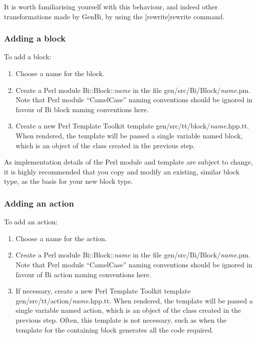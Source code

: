 It is worth familiarising yourself with this behaviour, and indeed other
transformations made by GenBi, by using the
\hyperref[hyper][rewrite]{\sf rewrite} command.

\subsubsection{Adding a block}

To add a block:
\begin{enumerate}
\item Choose a name for the block.
\item Create a Perl module \textsf{Bi::Block::\textit{name}} in the
  file \textsf{gen/src/Bi/Block/\textit{name}.pm}. Note that Perl module
  ``CamelCase'' naming conventions should be ignored in favour of Bi block
  naming conventions here.
\item Create a new Perl Template Toolkit template
  \textsf{gen/src/tt/block/\textit{name}.hpp.tt}. When rendered, the template
  will be passed a single variable named \textsf{block}, which is an object of
  the class created in the previous step.
\end{enumerate}

As implementation details of the Perl module and template are subject to
change, it is highly recommended that you copy and modify an existing, similar
block type, as the basis for your new block type.

\subsubsection{Adding an action}

To add an action:
\begin{enumerate}
\item Choose a name for the action.
\item Create a Perl module \textsf{Bi::Block::\textit{name}} in the
  file \textsf{gen/src/Bi/Block/\textit{name}.pm}. Note that Perl module
  ``CamelCase'' naming conventions should be ignored in favour of Bi action
  naming conventions here.
\item If necessary, create a new Perl Template Toolkit template
  \textsf{gen/src/tt/action/\textit{name}.hpp.tt}. When rendered, the template
  will be passed a single variable named \textsf{action}, which is an object
  of the class created in the previous step. Often, this template is not
  necessary, such as when the template for the containing block generates all
  the code required.
\end{enumerate}

